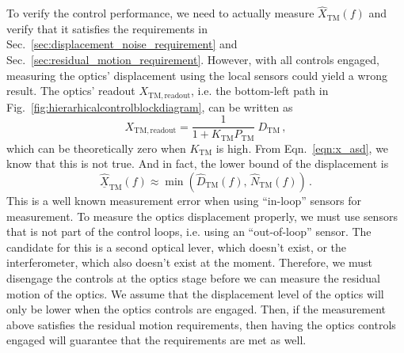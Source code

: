 To verify the control performance, we need to actually measure $\hat{X}_\mathrm{TM}(f)$ and verify that it satisfies the requirements in Sec.~\ref{sec:displacement_noise_requirement} and Sec.~\ref{sec:residual_motion_requirement}.
However, with all controls engaged, measuring the optics' displacement using the local sensors could yield a wrong result.
The optics' readout $X_\mathrm{TM, readout}$, i.e. the bottom-left path in Fig.~\ref{fig:hierarhicalcontrolblockdiagram}, can be written as
\begin{equation}
	X_\mathrm{TM, readout} = \frac{1}{1+K_\mathrm{TM}P_\mathrm{TM}}\ D_\mathrm{TM}\,,
\end{equation}
which can be theoretically zero when $K_\mathrm{TM}$ is high.
From Eqn.~\eqref{eqn:x_asd}, we know that this is not true.
And in fact, the lower bound of the displacement is
\begin{equation}
	\underline{\hat{X}}_\mathrm{TM}(f)\approx\min\left(\hat{D}_\mathrm{TM}(f),\, \hat{N}_\mathrm{TM}(f)\right)\,.
\end{equation}
This is a well known measurement error when using ``in-loop'' sensors for measurement.
To measure the optics displacement properly, we must use sensors that is not part of the control loops, i.e. using an ``out-of-loop'' sensor.
The candidate for this is a second optical lever, which doesn't exist, or the interferometer, which also doesn't exist at the moment.
Therefore, we must disengage the controls at the optics stage before we can measure the residual motion of the optics.
We assume that the displacement level of the optics will only be lower when the optics controls are engaged.
Then, if the measurement above satisfies the residual motion requirements, then having the optics controls engaged will guarantee that the requirements are met as well.

